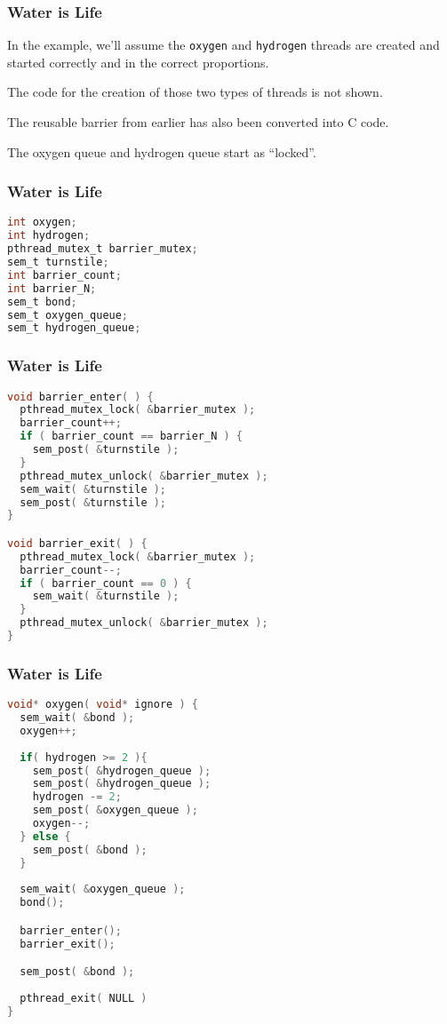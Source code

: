 \begin{frame}
	\frametitle{Water is Life}

	In the example, we'll assume the \texttt{oxygen} and \texttt{hydrogen} threads are created and started correctly and in the correct proportions.

	The code for the creation of those two types of threads is not shown.

	The reusable barrier from earlier has also been converted into C code.

	The oxygen queue and hydrogen queue start as ``locked''.

\end{frame}

\begin{frame}[fragile]
	\frametitle{Water is Life}

	\begin{lstlisting}[language=C]
int oxygen;
int hydrogen;
pthread_mutex_t barrier_mutex;
sem_t turnstile;
int barrier_count;
int barrier_N;
sem_t bond;
sem_t oxygen_queue;
sem_t hydrogen_queue;
\end{lstlisting}
\end{frame}

\begin{frame}[fragile]
	\frametitle{Water is Life}

	\begin{lstlisting}[language=C]
void barrier_enter( ) {
  pthread_mutex_lock( &barrier_mutex );
  barrier_count++;
  if ( barrier_count == barrier_N ) {
    sem_post( &turnstile );
  }
  pthread_mutex_unlock( &barrier_mutex );
  sem_wait( &turnstile );
  sem_post( &turnstile );            
}

void barrier_exit( ) {
  pthread_mutex_lock( &barrier_mutex );
  barrier_count--;
  if ( barrier_count == 0 ) {
    sem_wait( &turnstile );
  }
  pthread_mutex_unlock( &barrier_mutex );
}
\end{lstlisting}

\end{frame}

\begin{frame}[fragile]
	\frametitle{Water is Life}

	\begin{lstlisting}[language=C]
void* oxygen( void* ignore ) {
  sem_wait( &bond );
  oxygen++;
  
  if( hydrogen >= 2 ){
    sem_post( &hydrogen_queue );
    sem_post( &hydrogen_queue );
    hydrogen -= 2;
    sem_post( &oxygen_queue );
    oxygen--;
  } else {
    sem_post( &bond );
  }
  
  sem_wait( &oxygen_queue );
  bond();

  barrier_enter();
  barrier_exit();

  sem_post( &bond );
  
  pthread_exit( NULL )
}
\end{lstlisting}
\end{frame}


